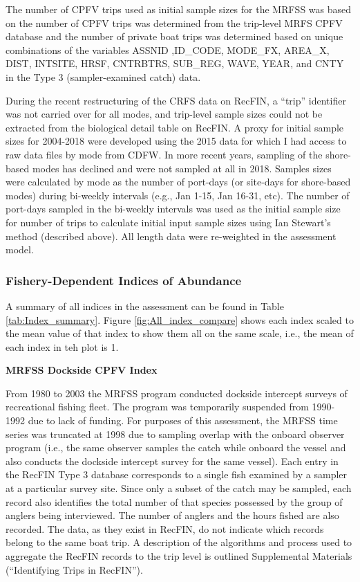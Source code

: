 \documentclass[12pt,]{article}
\begin{document}
The number of CPFV trips used as initial sample sizes for the MRFSS was
based on the number of CPFV trips was determined from the trip-level
MRFS CPFV database and the number of private boat trips was determined
based on unique combinations of the variables ASSNID ,ID\_CODE,
MODE\_FX, AREA\_X, DIST, INTSITE, HRSF, CNTRBTRS, SUB\_REG, WAVE, YEAR,
and CNTY in the Type 3 (sampler-examined catch) data.

During the recent restructuring of the CRFS data on RecFIN, a ``trip''
identifier was not carried over for all modes, and trip-level sample
sizes could not be extracted from the biological detail table on RecFIN.
A proxy for initial sample sizes for 2004-2018 were developed using the
2015 data for which I had access to raw data files by mode from CDFW. In
more recent years, sampling of the shore-based modes has declined and
were not sampled at all in 2018. Samples sizes were calculated by mode
as the number of port-days (or site-days for shore-based modes) during
bi-weekly intervals (e.g., Jan 1-15, Jan 16-31, etc). The number of
port-days sampled in the bi-weekly intervals was used as the initial
sample size for number of trips to calculate initial input sample sizes
using Ian Stewart's method (described above). All length data were
re-weighted in the assessment model.

\subsubsection{Fishery-Dependent Indices of
Abundance}\label{fishery-dependent-indices-of-abundance}

A summary of all indices in the assessment can be found in Table
\ref{tab:Index_summary}. Figure \ref{fig:All_index_compare} shows each
index scaled to the mean value of that index to show them all on the
same scale, i.e., the mean of each index in teh plot is 1.

\textbf{MRFSS Dockside CPFV Index}

From 1980 to 2003 the MRFSS program conducted dockside intercept surveys
of recreational fishing fleet. The program was temporarily suspended
from 1990-1992 due to lack of funding. For purposes of this assessment,
the MRFSS time series was truncated at 1998 due to sampling overlap with
the onboard observer program (i.e., the same observer samples the catch
while onboard the vessel and also conducts the dockside intercept survey
for the same vessel). Each entry in the RecFIN Type 3 database
corresponds to a single fish examined by a sampler at a particular
survey site. Since only a subset of the catch may be sampled, each
record also identifies the total number of that species possessed by the
group of anglers being interviewed. The number of anglers and the hours
fished are also recorded. The data, as they exist in RecFIN, do not
indicate which records belong to the same boat trip. A description of
the algorithms and process used to aggregate the RecFIN records to the
trip level is outlined Supplemental Materials (``Identifying Trips in
RecFIN'').
\end{document}
